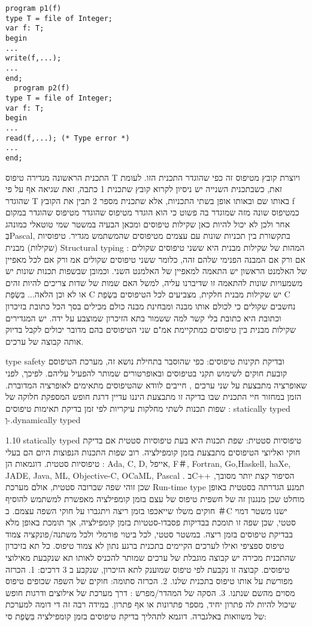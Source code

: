 \begin{verbatim}
program p1(f)
type T = file of Integer;
var f: T;
begin
...
write(f,...);
...
end;
  program p2(f)
type T = file of Integer;
var f: T;
begin
...
read(f,...); (* Type error *)
...
end;
\end{verbatim}

      התכנית הראשונה מגדירה טיפוס T ויוצרת קובץ מטיפוס זה כפי שהוגדר התכנית הזו.
      לעומת זאת, כשבתכנית השנייה יש ניסיון לקרוא קובץ שתכנית 1 כתבה, זאת שגיאה אף על
      פי שהוגדר T באותו שם ובאותו אופן בשתי התכניות, אלא שתכנית מספר 2 תבין את הקובץ
      f כמטיפוס שונה מזה שמוגדר בה פשוט כי הוא הוגדר מטיפוס שהוגדר מטיפוס שהוגדר
      במקום אחר ולכן לא יכול להיות כאן שקילות טיפוסים ומכאן הבעיה במשטר שמי טוטאלי
      כמונהג בְּPascal, בתקשורת בין תכניות שונות עם עצמים מטיפוסים שהמשתמש מגדיר.
      טיפוסיות (שקילות) מבנית Structural typing :
      המהות של שקילות מבנית היא ששני טיפוסים שקולים אם ורק אם המבנה הפנימי שלהם זהה, כלומר ששני טיפוסים שקולים אמ ורק אם לכל מאפיין של האלמנט הראשון יש התאמה למאפיין של האלמנט השני. וכמובן שבשפות תכנות שונות יש משמעויות שונות להתאמה זו שדיברנו עליה, למשל האם שמות של שדות צריכים להיות זהים או לא וכן הלאה...
      בִּשְׂפַת C יש שקילות מבנית חלקית, מצביעים לכל הטיפוסים בִּשְׂפַת C נחשבים שקולים כי לכולם אותו מבנה ומבחינת מבנה כולם מכילים בסך הכל כתובת בזיכרון וכתובת היא כתובת בלי קשר למה ששמור בתא הזיכרון שמוצבע על ידה.
      יש המגדירים שקילות מבנית בין טיפוסים כמתקיימת אמ"ם שני הטיפוסים בהם מדובר יכולים לקבל בדיוק אותה קבוצה של ערכים.

      type safety ובדיקת תקינות טיפוסים:
      כפי שהוסבר בתחילת נושא זה, מערכת הטיפוסם קובעת חוקים לשימוש תקני בטיפוסים ובאופרטורים שמותר להפעיל עליהם. לפיכך, לפני שאופרציה מתבצעת על שני ערכים , חייבים לוודא שהטיפוסים מתאימים לאופרציה המדוברת. הזמן במחזור חיי התכנית שבו בדיקה זו מתבצעת היננו עדיין דרגת חופש המספקת חלוקה של שפות תכנות לשתי מחלקות עיקריות לפי זמן בדיקת תאימות טיפוסים : statically typed וְ-.dynamically typed

      1.10 statically typed טיפוסיות סטטית:
      שפת תכנות היא בעת טיפוסיות סטטית אם בדיקת חוקי ואליוצי הטיפוסים מתבצעת בזמן קומפילציה. רוב שפות התכנות הנפוצות היום הם בעלי טיפוסיות סטטית. דוגמאות הן :
      Ada, C, D, אייפל, F＃, Fortran, Go,Haskell, haXe, JADE, Java, ML, Objective-C, OCaML, Pascal .
      בC++ הסיפור קצת יותר מסובך, שכן זוהי שפה שברובה סטטית, אולם מערכת Run-time type תמנע הגדרתה בסטטית באופן מוחלט שכן מנגנון זה של חשפית טיפוס של עצם בזמן קומפילציה מאפשרת למשתמש להוסיף חוקים משלו שייאכפו בזמן ריצה ויתגברו על חוקי השפה עצמם.
      ב ＃C ישנו משטר דמוי סטטי, שכן שפה זו תומכת בבדיקות פסבדו-סטטיות בזמן קומפילציה, אך תומכת באופן מלא בבדיקת טיפוסים בזמן ריצה.
      במשטר סטטי, לכל ביטוי פורמלי ולכל משתנה/פונקציה צמוד טיפוס ספציפי ואילו לערכים הקיימים בתכנית ברגע נתון לא צמוד טיפוס. כל תא בזיכרון שהתכנית מכירה יש קבוצה מוגבלת של ערכים שמותר להכניס לאותו תא שנקבעת מאילוצי טיפוסים. קבוצה זו נקבעת לפי טיפוס שמוענק לתא הזיכרון, שנקבע ב 3 דרכים:
      1. הכרזה מפורשת על אותו טיפוס בתכנית שלנו.
      2. הכרזה סתומה: חוקים של השפה שכופים טיפוס מסוים מהשם שנתנו.
      3. הסקה של המהדר/מפרש : דרך מערכת של אילוצים ודרגות חופש שיכול להיות לה פתרון יחיד, מספר פתרונות או אף פתרון. במידה רבה זה די דומה למערכת של משוואות באלגברה.
      דוגמא לתהליך בדיקת טיפוסים בזמן קומפילציה בִּשְׂפַת סי:

